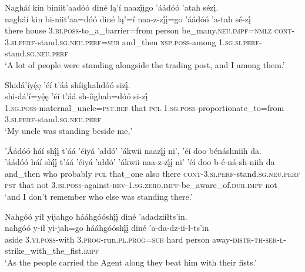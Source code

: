 \ea\label{ex:text1-43-1}
Nagháí kin biniit’aadóó diné lą’í naazį́įgo ’áádóó ’atah sézį́.\\
\gll nagháí	kin	bi-niit’aa=dóó	diné	lą’=í	naa-z-zį́į=go	’áádóó	’a-tah	sé-zį́\\
     there	house	3.\textsc{bi}.\textsc{poss}-to\_a\_barrier=from	person	be\_many.\textsc{neu}.\textsc{impf}=\textsc{nmlz}	\textsc{cont}-3.\textsc{si}.\textsc{perf}-stand.\textsc{sg}.\textsc{neu}.\textsc{perf}=\textsc{sub}	and\_then	\textsc{nsp}.\textsc{poss}-among	1.\textsc{sg}.\textsc{si}.\textsc{perf}-stand.\textsc{sg}.\textsc{neu}.\textsc{perf}\\
\glt `A lot of people were standing alongside the trading post, and I among them.'
\z

\ea\label{ex:text1-43-2}
Shidá’íyę́ę ’éí t’áá shíighahdóó sizį́.\\
\gll shi-dá’í=yę́ę	’éí	t’áá	sh-íighah=dóó	si-zį́\\
     1.\textsc{sg}.\textsc{poss}-maternal\_uncle=\textsc{pst}.\textsc{ref}	that	\textsc{pcl}	1.\textsc{sg}.\textsc{poss}-proportionate\_to=from	3.\textsc{si}.\textsc{perf}-stand.\textsc{sg}.\textsc{neu}.\textsc{perf}\\
\glt `My uncle was standing beside me,'
\z

\ea\label{ex:text1-43-3}
’Áádóó háí shį́į́ t’áá ’éiyá ’ałdó’ ’ákwii naazį́į ni’, ’éí doo bénáshniih da.\\
\gll ’áádóó	háí	shį́į́	t’áá	’éiyá	’ałdó’	’ákwii	naa-z-zį́į	ni’	’éí	doo	b-é-ná-sh-niih	da\\
     and\_then	who	probably	\textsc{pcl}	that\_one	also	there	\textsc{cont}-3.\textsc{si}.\textsc{perf}-stand.\textsc{sg}.\textsc{neu}.\textsc{perf}	\textsc{pst}	that	not	3.\textsc{bi}.\textsc{poss}-against-\textsc{rev}-1.\textsc{sg}.\textsc{zero}.\textsc{impf}-be\_aware\_of.\textsc{dur}.\textsc{impf}	not\\
\glt `and I don't remember who else was standing there.'
\z

\ea\label{ex:text1-43-4}
Nahgóó yił yijahgo hááhgóóshį́į́ diné ’adadziiłts’in.\\
\gll nahgóó	y-ił	yi-jah=go	hááhgóóshį́į́	diné	’a-da-dz-ii-ł-ts’in\\
     aside	3.\textsc{yi}.\textsc{poss}-with	3.\textsc{prog}-run.\textsc{pl}.\textsc{prog}=\textsc{sub}	hard	person	away-\textsc{distr}-\textsc{th}-\textsc{ser}-\textsc{ł}-strike\_with\_the\_fist.\textsc{impf}\\
\glt `As the people carried the Agent along they beat him with their fists.'
\z

